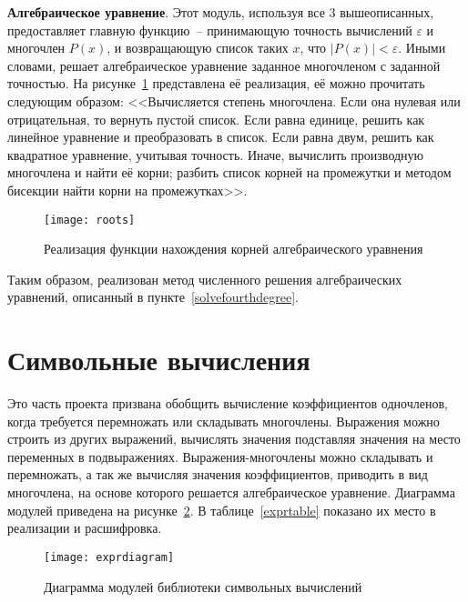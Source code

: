 \textbf{Алгебраическое уравнение}.\label{equationdescr}
Этот модуль, используя все 3 вышеописанных, предоставляет главную функцию~-- принимающую
точность вычислений \(\varepsilon\) и многочлен \(P(x)\), и возвращающую список таких \(x\), что \(\left|P(x)\right| < \varepsilon\).
Иными словами, решает алгебраическое уравнение заданное многочленом с заданной точностью. На рисунке~\ref{rootscode}
представлена её реализация, её можно прочитать следующим образом:
<<Вычисляется степень многочлена.
Если она нулевая или отрицательная, то вернуть пустой список.
Если равна единице, решить как линейное уравнение и преобразовать в список.
Если равна двум, решить как квадратное уравнение, учитывая точность.
Иначе, вычислить производную многочлена и найти её корни; разбить список корней на промежутки и методом бисекции найти корни на промежутках>>.

\begin{figure}[H]
    \centering
    \texttt{[image: roots]}
    \caption{Реализация функции нахождения корней алгебраического уравнения\label{rootscode}}
\end{figure}

Таким образом, реализован метод численного решения алгебраических уравнений, описанный в пункте~\ref{solvefourthdegree}.

\section{Символьные вычисления}\label{expr}

Это часть проекта призвана обобщить вычисление коэффициентов одночленов, когда требуется перемножать или складывать многочлены.
Выражения можно строить из других выражений, вычислять значения подставляя значения на место переменных в подвыражениях.
Выражения-многочлены можно складывать и перемножать, а так же вычисляя значения коэффициентов, приводить в вид многочлена,
на основе которого решается алгебраическое уравнение.
Диаграмма модулей приведена на рисунке~\ref{exprdiagramfig}. В таблице~\ref{exprtable} показано их место в реализации и расшифровка.

\begin{figure}[H]
    \centering
    \texttt{[image: exprdiagram]}
    \caption{Диаграмма модулей библиотеки символьных вычислений\label{exprdiagramfig}}
\end{figure}

